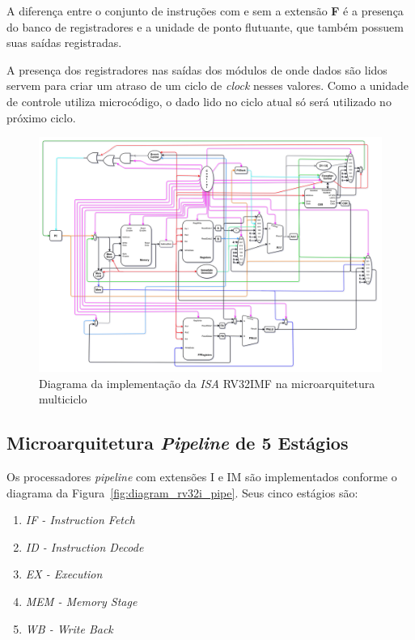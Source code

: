         { A diferença entre o conjunto de instruções com e sem a extensão \textbf{F}
            é a presença do banco de registradores e a unidade de ponto flutuante,
            que também possuem suas saídas registradas.
        }

        { A presença dos registradores nas saídas dos módulos de onde dados são
            lidos servem para criar um atraso de um ciclo de \textit{clock} nesses
            valores. Como a unidade de controle utiliza microcódigo, o dado lido
            no ciclo atual só será utilizado no próximo ciclo.
        }

        \begin{figure}[H]
        \centering
            \includegraphics[width=.9\linewidth]{../images/uarch_diagrams/multicycle-RV32IMF.png}
            \caption{Diagrama da implementação da \textit{ISA} RV32IMF na
            microarquitetura multiciclo}\label{fig:diagram_rv32imf_multi}
        \end{figure}


    \subsection{Microarquitetura \textit{Pipeline} de 5 Estágios}
        { Os processadores \textit{pipeline} com extensões I e IM são
            implementados conforme o diagrama da Figura~\ref{fig:diagram_rv32i_pipe}.
            Seus cinco estágios são:
            \begin{enumerate}
                \item \textit{IF - Instruction Fetch}
                \item \textit{ID - Instruction Decode}
                \item \textit{EX - Execution}
                \item \textit{MEM - Memory Stage}
                \item \textit{WB - Write Back}
            \end{enumerate}
        }

